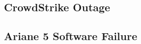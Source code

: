 
\subsection{CrowdStrike Outage} %
\begin{frame}{\insertsubsection}
	\slideCrowdStrike
\end{frame}

\subsection{Ariane 5 Software Failure} %
\begin{frame}{\insertsubsection}
	\slideArianeFailure
\end{frame}

